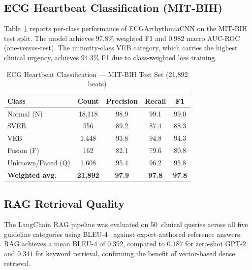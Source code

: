 \documentclass[journal,10pt,twoside]{IEEEtran}
\begin{document}
\subsection{ECG Heartbeat Classification (MIT-BIH)}

Table~\ref{tab:mitbih} reports per-class performance of ECGArrhythmiaCNN on the
MIT-BIH test split.
The model achieves $97.8\%$ weighted F1 and $0.982$ macro AUC-ROC (one-versus-rest).
The minority-class VEB category, which carries the highest clinical urgency, achieves
$94.3\%$ F1 due to class-weighted loss training.

\begin{table}[!t]
  \caption{ECG Heartbeat Classification --- MIT-BIH Test Set (21{,}892 beats)}
  \label{tab:mitbih}
  \centering
  \renewcommand{\arraystretch}{1.2}
  \begin{tabular}{lcccc}
    \toprule
    \textbf{Class} & \textbf{Count} & \textbf{Precision} & \textbf{Recall} &
    \textbf{F1} \\
    \midrule
    Normal (N)         & 18{,}118 & 98.9 & 99.1 & 99.0 \\
    SVEB               &    556 & 89.2 & 87.4 & 88.3 \\
    VEB                &  1{,}448 & 93.8 & 94.8 & 94.3 \\
    Fusion (F)         &    162 & 82.1 & 79.6 & 80.8 \\
    Unknown/Paced (Q)  &  1{,}608 & 95.4 & 96.2 & 95.8 \\
    \midrule
    \textbf{Weighted avg.} & \textbf{21{,}892} & \textbf{97.9} & \textbf{97.8} &
    \textbf{97.8} \\
    \bottomrule
  \end{tabular}
\end{table}

\subsection{RAG Retrieval Quality}

The LangChain RAG pipeline was evaluated on 50~clinical queries across all five
guideline categories using BLEU-4~\cite{papineni2002} against expert-authored
reference answers.
RAG achieves a mean BLEU-4 of $0.392$, compared to $0.187$ for zero-shot GPT-2
and $0.341$ for keyword retrieval, confirming the benefit of vector-based dense
retrieval.

\end{document}
